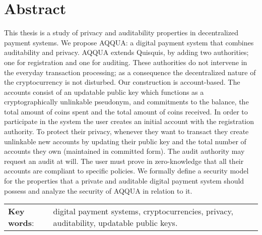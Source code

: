 \chapter*{Abstract}
This thesis is a study of privacy and auditability properties in decentralized payment systems.
We propose AQQUA: a digital payment system that combines auditability and privacy.
AQQUA extends Quisquis, by adding two authorities; one for registration and one for auditing.
These authorities do not intervene in the everyday transaction processing; as a consequence the decentralized nature of the cryptocurrency is not disturbed. 
Our construction is account-based. 
The accounts consist of an updatable public key which functions as a cryptographically unlinkable pseudonym,
and commitments to the balance, the total amount of coins spent and the total amount of coins received.
In order to participate in the system the user creates an initial account with the registration authority. 
To protect their privacy, whenever they want to transact they create unlinkable new accounts by updating their public key and the total number of accounts they own (maintained in committed form). 
The audit authority may request an audit at will. The user must prove in zero-knowledge that all their accounts are compliant to  specific policies.
We formally define a security model for the properties that a private and auditable digital payment system should possess and analyze the security of AQQUA in relation to it. 
\vspace{20ex}


\begin{table}[ht]
    \centering
    \begin{tabular}{p{\mylen} p{\linewidth - \mylen}}
      \textbf{Key words}: & digital payment systems, cryptocurrencies, privacy, auditability, updatable public keys. \\
    \end{tabular}
\end{table}

\newpage
\hspace{10pt}


